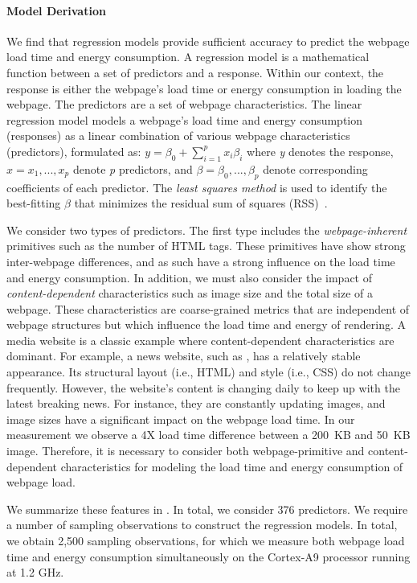 

\paragraph{Model Derivation} We find that regression models provide sufficient accuracy to predict the webpage load time and energy consumption. A regression model is a mathematical function between a set of predictors and a response. Within our context, the response is either the webpage's load time or energy consumption in loading the webpage. The predictors are a set of webpage characteristics. The linear regression model models a webpage's load time and energy consumption (responses) as a linear combination of various webpage characteristics (predictors), formulated as: $y = \beta_0 + \sum_{i=1}^{p} x_i \beta_i$ where \textit{y} denotes the response, \textit{$x = x_{1},...,x_{p}$} denote \textit{p} predictors, and \textit{$\beta = \beta_{0},...,\beta_{p}$} denote corresponding coefficients of each predictor. The \textit{least squares method} is used to identify the best-fitting $\beta$ that minimizes the residual sum of squares (RSS)~\cite{ESL}.

We consider two types of predictors. The first type includes the \textit{webpage-inherent} primitives such as the number of HTML tags. These primitives have show strong inter-webpage differences, and as such have a strong influence on the load time and energy consumption. In addition, we must also consider the impact of \textit{content-dependent} characteristics such as image size and the total size of a webpage. These characteristics are coarse-grained metrics that are independent of webpage structures but which influence the load time and energy of rendering. A media website is a classic example where content-dependent characteristics are dominant. For example, a news website, such as , has a relatively stable appearance. Its structural layout (i.e., HTML) and style (i.e., CSS) do not change frequently. However, the website's content is changing daily to keep up with the latest breaking news. For instance, they are constantly updating images, and image sizes have a significant impact on the webpage load time. In our measurement we observe a 4X load time difference between a 200~KB and 50~KB image. Therefore, it is necessary to consider both webpage-primitive and content-dependent characteristics for modeling the load time and energy consumption of webpage load.

We summarize these features in . In total, we consider 376 predictors. We require a number of sampling observations to construct the regression models. In total, we obtain 2,500 sampling observations, for which we measure both webpage load time and energy consumption simultaneously on the Cortex-A9 processor running at 1.2 GHz.
 
